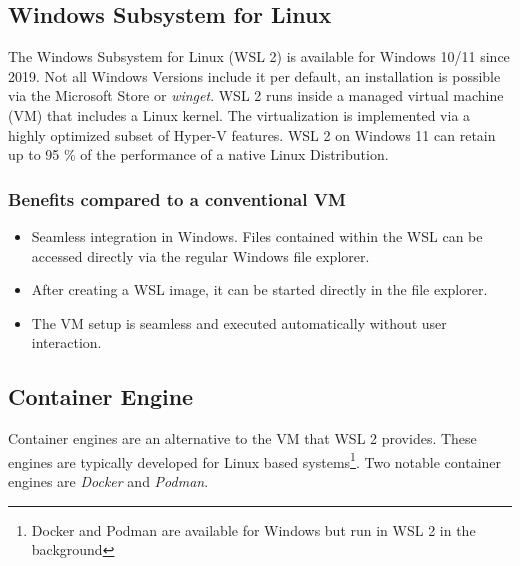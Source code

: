 \subsection{Windows Subsystem for Linux}

The Windows Subsystem for Linux (WSL 2) is available for Windows 10/11 since 2019.
Not all Windows Versions include it per default, an installation is possible via the Microsoft Store or \emph{winget}.
WSL 2 runs inside a managed virtual machine (VM) that includes a Linux kernel.
The virtualization is implemented via a highly optimized subset of Hyper-V features.
WSL 2 on Windows 11 can retain up to 95 \% of the performance of a native Linux Distribution.

\subsubsection*{Benefits compared to a conventional VM}

\begin{itemize}
  \item Seamless integration in Windows.
    Files contained within the WSL can be accessed directly via the regular Windows file explorer.
  \item After creating a WSL image, it can be started directly in the file explorer.
  \item The VM setup is seamless and executed automatically without user
    interaction.
\end{itemize}

\subsection{Container Engine}

Container engines are an alternative to the VM that WSL 2 provides.
These engines are typically developed for Linux based systems\footnote{Docker and Podman are available for Windows but run in WSL 2 in the background}.
Two notable container engines are \emph{Docker} and \emph{Podman}.

\newpage



\newpage



\newpage



\newpage



